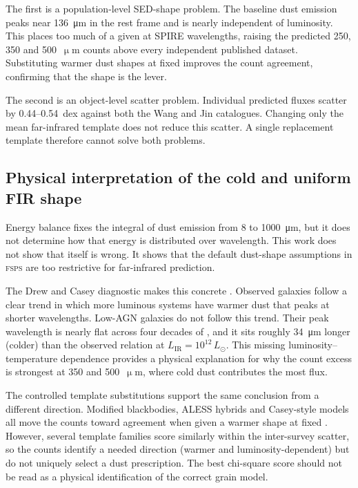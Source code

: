\documentclass[12pt,a4paper]{article}
\begin{document}
The first is a population-level SED-shape problem. The baseline dust emission peaks
near \SI{136}{\um} in the rest frame and is nearly independent of luminosity. This
places too much of a given \LIR{} at SPIRE wavelengths, raising the predicted 250, 350
and 500~$\upmu$m counts above every independent published dataset. Substituting warmer
dust shapes at fixed \LIR{} improves the count agreement, confirming that the shape is
the lever.

The second is an object-level scatter problem. Individual predicted fluxes scatter by
0.44--\SI{0.54}{dex} against both the Wang and Jin catalogues. Changing only
the mean far-infrared template does not reduce this scatter. A single replacement
template therefore cannot solve both problems.

\subsection{Physical interpretation of the cold and uniform FIR shape}
\label{sec:discussion:cold}

Energy balance fixes the integral of dust emission from 8 to \SI{1000}{\um}, but it
does not determine how that energy is distributed over wavelength. This work does not
show that \LIR{} itself is wrong. It shows that the default dust-shape assumptions in
\textsc{fsps} are too restrictive for far-infrared prediction.

The Drew and Casey diagnostic makes this concrete \citep{Drew_2022}. Observed galaxies
follow a clear trend in which more luminous systems have warmer dust that peaks at
shorter wavelengths. Low-AGN \popcosmos{} galaxies do not follow this trend. Their
peak wavelength is nearly flat across four decades of \LIR{}, and it sits roughly
\SI{34}{\um} longer (colder) than the observed relation at
$L_\mathrm{IR} = 10^{12}\,L_\odot$. This missing luminosity--temperature dependence
provides a physical explanation for why the count excess is strongest at 350 and
500~$\upmu$m, where cold dust contributes the most flux.

The controlled template substitutions support the same conclusion from a different
direction. Modified blackbodies, ALESS hybrids and Casey-style models all move the
counts toward agreement when given a warmer shape at fixed \LIR{}
\citep{Casey_2012,Swinbank_2013}. However, several template families score similarly
within the inter-survey scatter, so the counts identify a needed direction (warmer and
luminosity-dependent) but do not uniquely select a dust prescription. The best
chi-square score should not be read as a physical identification of the correct grain
model.
\end{document}
